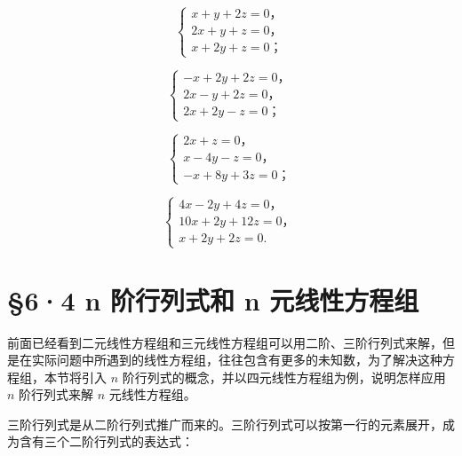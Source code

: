\[
\left\{ \begin{array}{l} x + y + 2 z = 0\text{，} \\ 2 x + y + z = 0\text{，} \\ x + 2 y + z = 0\text{；} \end{array} \right. \tag {1}
\]

\[
\left\{ \begin{array}{l} - x + 2 y + 2 z = 0\text{，} \\ 2 x - y + 2 z = 0\text{，} \\ 2 x + 2 y - z = 0\text{；} \end{array} \right. \tag {2}
\]

\[
\left\{ \begin{array}{l} 2 x + z = 0\text{，} \\ x - 4 y - z = 0\text{，} \\ - x + 8 y + 3 z = 0\text{；} \end{array} \right. \tag {3}
\]

\[
\left\{ \begin{array}{l} 4 x - 2 y + 4 z = 0\text{，} \\ 10 x + 2 y + 12 z = 0\text{，} \\ x + 2 y + 2 z = 0. \end{array} \right. \tag {4}
\]

\section{§6·4 n 阶行列式和 n 元线性方程组}\label{n-ux9636ux884cux5217ux5f0fux548c-n-ux5143ux7ebfux6027ux65b9ux7a0bux7ec4}

前面已经看到二元线性方程组和三元线性方程组可以用二阶、三阶行列式来解，但是在实际问题中所遇到的线性方程组，往往包含有更多的未知数，为了解决这种方程组，本节将引入
\(n\) 阶行列式的概念，并以四元线性方程组为例，说明怎样应用 \(n\)
阶行列式来解 \(n\) 元线性方程组。

三阶行列式是从二阶行列式推广而来的。三阶行列式可以按第一行的元素展开，成为含有三个二阶行列式的表达式：

